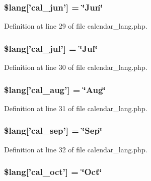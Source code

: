 \subsubsection[{\$lang}]{\setlength{\rightskip}{0pt plus 5cm}\$lang['cal\-\_\-jun'] = \char`\"{}Jun\char`\"{}}\label{calendar__lang_8php_aabea2be5e0612f96b8d388183c4a3ebb}


Definition at line 29 of file calendar\-\_\-lang.\-php.

\subsubsection[{\$lang}]{\setlength{\rightskip}{0pt plus 5cm}\$lang['cal\-\_\-jul'] = \char`\"{}Jul\char`\"{}}\label{calendar__lang_8php_a65585e0f8fda86a900ced005f0bb3c16}


Definition at line 30 of file calendar\-\_\-lang.\-php.

\subsubsection[{\$lang}]{\setlength{\rightskip}{0pt plus 5cm}\$lang['cal\-\_\-aug'] = \char`\"{}Aug\char`\"{}}\label{calendar__lang_8php_ab7a387970f84455d8f289020761aeb83}


Definition at line 31 of file calendar\-\_\-lang.\-php.

\subsubsection[{\$lang}]{\setlength{\rightskip}{0pt plus 5cm}\$lang['cal\-\_\-sep'] = \char`\"{}Sep\char`\"{}}\label{calendar__lang_8php_a09ed21f8320998bf99f89cc5121a69b2}


Definition at line 32 of file calendar\-\_\-lang.\-php.

\subsubsection[{\$lang}]{\setlength{\rightskip}{0pt plus 5cm}\$lang['cal\-\_\-oct'] = \char`\"{}Oct\char`\"{}}\label{calendar__lang_8php_af4d1254dc312bf5e945d47d1011f35f7}


